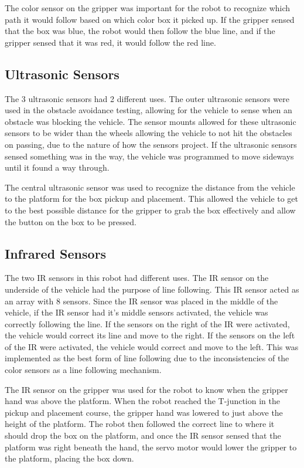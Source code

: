 \documentclass[11pt]{report}
\begin{document}
\par The color sensor on the gripper was important for the robot to recognize which path it would follow based on which color box it picked up. If the gripper sensed that the box was blue, the robot would then follow the blue line, and if the gripper sensed that it was red, it would follow the red line. 

\subsection{Ultrasonic Sensors}
The 3 ultrasonic sensors had 2 different uses. The outer ultrasonic sensors were used in the obstacle avoidance testing, allowing for the vehicle to sense when an obstacle was blocking the vehicle. The sensor mounts allowed for these ultrasonic sensors to be wider than the wheels allowing the vehicle to not hit the obstacles on passing, due to the nature of how the sensors project. If the ultrasonic sensors sensed something was in the way, the vehicle was programmed to move sideways until it found a way through. 

\par The central ultrasonic sensor was used to recognize the distance from the vehicle to the platform for the box pickup and placement. This allowed the vehicle to get to the best possible distance for the gripper to grab the box effectively and allow the button on the box to be pressed. 

\subsection{Infrared Sensors}
The two \gls{IR} sensors in this robot had different uses. The \gls{IR} sensor on the underside of the vehicle had the purpose of line following. This \gls{IR} sensor acted as an array with 8 sensors. Since the \gls{IR} sensor was placed in the middle of the vehicle, if the \gls{IR} sensor had it's middle sensors activated, the vehicle was correctly following the line. If the sensors on the right of the \gls{IR} were activated, the vehicle would correct its line and move to the right. If the sensors on the left of the \gls{IR} were activated, the vehicle would correct and move to the left. This was implemented as the best form of line following due to the inconsistencies of the color sensors as a line following mechanism. 
\par The \gls{IR} sensor on the gripper was used for the robot to know when the gripper hand was above the platform. When the robot reached the T-junction in the pickup and placement course, the gripper hand was lowered to just above the height of the platform. The robot then followed the correct line to where it should drop the box on the platform, and once the \gls{IR} sensor sensed that the platform was right beneath the hand, the servo motor would lower the gripper to the platform, placing the box down.
\end{document}
